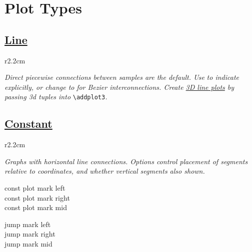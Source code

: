 \section{Plot Types}


\subsection*{\href{\docurl\#pgfp./tikz/sharp:plot}{Line}}

\begin{wrapfigure}[5]{r}{2.2cm}
\vspace{-8mm}
\resizebox{2cm}{!}{}
\end{wrapfigure}


\textit{Direct piecewise connections between samples are the default. Use }\textit{ to indicate explicitly, or change to }\href{\docurl\#pgfp./tikz/smooth}{}\textit{ for Bezier interconnections. Create \href{\docurl\#pgfp.back/addplot3}{3D line plots} by passing 3d tuples into }\texttt{\textbackslash addplot3}\textit{.}




\subsection*{\href{\docurl\#pgfp./pgfplots/hist}{Constant}}

\begin{wrapfigure}[5]{r}{2.2cm}
\vspace{-8mm}
\resizebox{2cm}{!}{}
\end{wrapfigure}
\textit{Graphs with horizontal line connections. Options control placement of segments relative to coordinates, and whether vertical segments also shown.}

{\color{blue}
\begin{minipage}[t]{3.5cm}
const plot mark left\\
const plot mark right\\
const plot mark mid
\end{minipage}
\begin{minipage}[t]{2.8cm}
jump mark left\\
jump mark right\\
jump mark mid
\end{minipage}}



